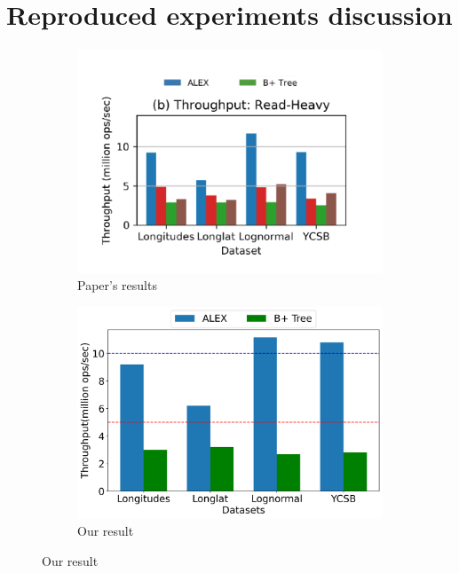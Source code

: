 \documentclass[12pt,a4paper]{article}
\begin{document}
\section{Reproduced experiments discussion}
\begin{figure}[htbp]
    \centering

    \begin{subfigure}{0.3\textwidth}
        \includegraphics[width=\linewidth]{Figures/readheavy.png}
        \caption{Paper's results}
        \label{fig:readheavy_paper}
    \end{subfigure}
    \begin{subfigure}{0.3\textwidth}
        \includegraphics[width=\linewidth]{Figures/Readheavy (3).png}
        \caption{Our result}
        \label{fig:readheavy_our}
    \end{subfigure}

\end{figure}
\end{document}
